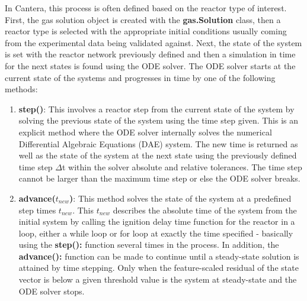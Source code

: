 In Cantera, this process is often defined based on the reactor type of interest. First, the gas solution object is created with the \textbf{gas.Solution} class, then a reactor type is selected with the appropriate initial conditions usually coming from the experimental data being validated against. Next, the state of the system is set with the reactor network previously defined and then a simulation in time for the next states is found using the ODE solver. The ODE solver starts at the current state  of the systems and progresses in time by one of the following methods:
\begin{enumerate}
    \item \textbf{step()}: This involves a reactor step from the current state of the system by solving the previous state of the system using the time step given. This is an explicit method where the ODE solver internally solves the numerical Differential Algebraic Equations (DAE) system. The new time is returned as well as the state of the system at the next state using the previously defined time step $\Delta$t within the solver absolute and relative tolerances. The time step cannot be larger than the maximum time step or else the ODE solver breaks.
    \item \textbf{advance($t_{new}$)}: This method solves the state of the system at a predefined step times $t_{new}$. This $t_{new}$ describes the absolute time of the system from the initial system by calling the ignition delay time function for the reactor in a loop, either a while loop or for loop at exactly the time specified - basically using the \textbf{step():} function several times in the process. In addition, the \textbf{advance():} function can be made to continue until a steady-state solution is attained by time stepping. Only when the feature-scaled residual of the state vector is below a given threshold value is the system at steady-state and the ODE solver stops.
\end{enumerate} 
